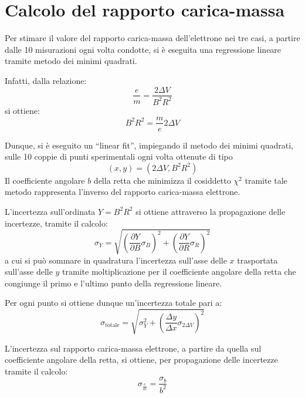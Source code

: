 \documentclass[a4paper,12pt]{article}
\begin{document}
\section{Calcolo del rapporto carica-massa}

Per stimare il valore del rapporto carica-massa dell’elettrone nei tre casi, a partire dalle 10 misurazioni ogni volta condotte, si è eseguita una regressione lineare tramite metodo dei minimi quadrati.

Infatti, dalla relazione:
\begin{equation}
    \frac{e}{m} = \frac{2 \Delta V}{B^2 R^2}
    \label{eq:rapporto_carica_massa}
\end{equation}
si ottiene:
\begin{equation}
    B^2 R^2 = \frac{m}{e} 2 \Delta V
    \label{eq:linear_relation}
\end{equation}

Dunque, si è eseguito un “linear fit”, impiegando il metodo dei minimi quadrati, sulle 10 coppie di punti sperimentali ogni volta ottenute di tipo 
\[
(x,y)= (2\Delta V , B^2R^2)
\]
Il coefficiente angolare \( b \) della retta che minimizza il cosiddetto \( \chi^2 \) tramite tale metodo rappresenta l’inverso del rapporto carica-massa elettrone.

L’incertezza sull’ordinata \( Y = B^2 R^2 \) si ottiene attraverso la propagazione delle incertezze, tramite il calcolo:
\begin{equation}
    \sigma_Y = \sqrt{\left( \frac{\partial Y}{\partial B} \sigma_B \right)^2 + \left( \frac{\partial Y}{\partial R} \sigma_R \right)^2}
    \label{eq:uncertainty_Y}
\end{equation}
a cui si può sommare in quadratura l’incertezza sull’asse delle \( x \) trasportata sull’asse delle \( y \) tramite moltiplicazione per il coefficiente angolare della retta che congiunge il primo e l’ultimo punto della regressione lineare.

Per ogni punto si ottiene dunque un’incertezza totale pari a:
\begin{equation}
    \sigma_{\text{totale}} = \sqrt{\sigma_Y^2 + \left( \frac{\Delta y}{\Delta x} \sigma_{2\Delta V} \right)^2}
    \label{eq:total_uncertainty}
\end{equation}

L’incertezza sul rapporto carica-massa elettrone, a partire da quella sul coefficiente angolare della retta, si ottiene, per propagazione delle incertezze tramite il calcolo:
\begin{equation}
    \sigma_{\frac{e}{m}} = \frac{\sigma_b}{b^2}
    \label{eq:uncertainty_em}
\end{equation}
\end{document}

